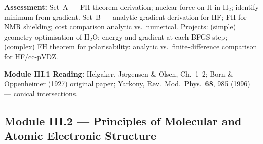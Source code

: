 \documentclass[11pt,a4paper]{article}
\begin{document}
\begin{tcolorbox}[chembox, title={Module~III.1 --- Lecture L03: Parametric Dependence and the Feynman--Hellmann Theorem}]
\medskip\textbf{Assessment:}
Set~A --- FH theorem derivation; nuclear force on H in H$_2$; identify minimum from gradient.
Set~B --- analytic gradient derivation for HF; FH for NMR shielding; cost comparison analytic vs.\ numerical.
Projects: (simple) geometry optimisation of H$_2$O: energy and gradient at each BFGS step; (complex) FH theorem for polarisability: analytic vs.\ finite-difference comparison for HF/cc-pVDZ.
\end{tcolorbox}

\begin{tcolorbox}[highlightbox]
\textbf{Module III.1 Reading:} Helgaker, J\o rgensen \& Olsen, Ch.~1--2; Born \& Oppenheimer (1927) original paper; Yarkony, Rev.\ Mod.\ Phys.\ \textbf{68}, 985 (1996) --- conical intersections.
\end{tcolorbox}

\subsection{Module III.2 --- Principles of Molecular and Atomic Electronic Structure}
\label{sec:mod-III2}
\end{document}
